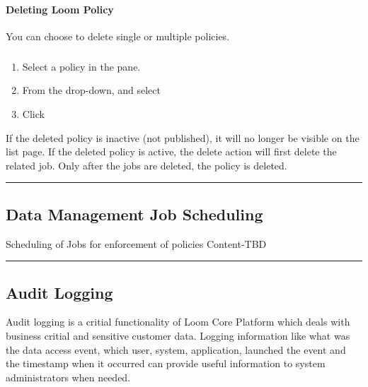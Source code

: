 \documentclass[letterpaper,10pt,english]{sphinxmanual}
\begin{document}
\paragraph{Deleting Loom Policy}
\label{\detokenize{loom_getting_started_guide:deleting-loom-policy}}
You can choose to delete single or multiple policies.


\subparagraph{}
\label{\detokenize{loom_getting_started_guide:to-delete-a-policy}}\begin{enumerate}
\item {} 
Select a policy in the  pane.

\item {} 
From the  drop-down, and select 

\item {} 
Click 

\end{enumerate}

If the deleted policy is inactive (not published), it will no longer be visible on the  list page. If the deleted policy is active, the delete action will first delete the related job. Only after the jobs are deleted, the policy is deleted.


\bigskip\hrule\bigskip



\subsection{Data Management Job Scheduling}
\label{\detokenize{loom_getting_started_guide:data-management-job-scheduling}}
Scheduling of Jobs for enforcement of policies
Content-TBD


\bigskip\hrule\bigskip



\subsection{Audit Logging}
\label{\detokenize{loom_getting_started_guide:audit-logging}}
Audit logging is a critial functionality of Loom Core Platform which deals with business critial and sensitive customer data. Logging information like what was the data access event, which user, system, application, launched the event and the timestamp when it occurred can provide useful information to  system administrators when needed.
\end{document}
